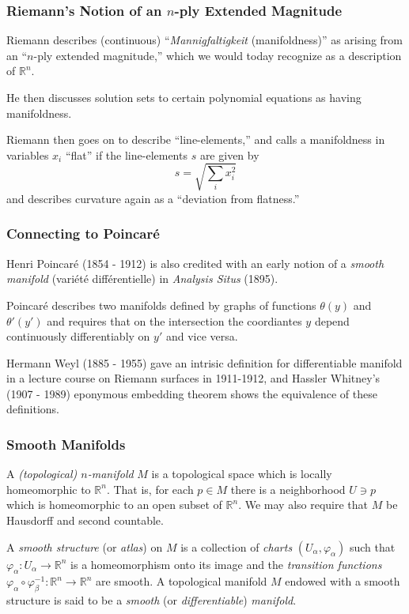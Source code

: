 \documentclass[handout]{beamer}
\newcommand{\R}{\mathbb{R}}
\theoremstyle{definition}
\begin{document}
\begin{frame}
    \frametitle{Riemann's Notion of an $n$-ply Extended Magnitude}

    Riemann describes (continuous) ``\textit{Mannigfaltigkeit} (manifoldness)''
    as arising from an ``$n$-ply extended magnitude,'' which we would today recognize
    as a description of $\R^n$.

    He then discusses solution sets to certain polynomial equations as having
    manifoldness.

    Riemann then goes on to describe ``line-elements,'' and calls a manifoldness
    in variables $x_i$ ``flat'' if the line-elements $s$ are given by
    \[
      s = \sqrt{\sum_i x_i^2}
    \]
    and describes curvature again as a ``deviation from flatness.''

\end{frame}

\begin{frame}
    \frametitle{Connecting to Poincar\'{e}}

    Henri Poincar\'{e} (1854 - 1912) is also credited with an early notion of
    a \emph{smooth manifold} (variété différentielle) in \textit{Analysis Situs}
    (1895).

    Poincar\'{e} describes two manifolds defined by graphs of functions $\theta(y)$
    and $\theta'(y')$ and requires that on the intersection the coordiantes $y$ depend
    continuously differentiably on $y'$ and vice versa.

    Hermann Weyl (1885 - 1955) gave an intrisic definition for differentiable manifold
    in a lecture course on Riemann surfaces in 1911-1912, and Hassler Whitney's (1907 - 1989)
    eponymous embedding theorem shows the equivalence of these definitions.

\end{frame}

\begin{frame}
    \frametitle{Smooth Manifolds}

    \begin{definition}
        A \emph{(topological) $n$-manifold} $M$ is a topological space which is
        locally homeomorphic to $\R^n$. That is, for each $p \in M$ there is
        a neighborhood $U \ni p$ which is homeomorphic to an open subset of $\R^n$.
        We may also require that $M$ be Hausdorff and second countable.
    \end{definition}
    \begin{definition}
        A \emph{smooth structure} (or \emph{atlas}) on $M$ is a collection
        of \emph{charts} $(U_\alpha, \varphi_\alpha)$ such that
        $\varphi_\alpha : U_\alpha \to \R^n$ is a homeomorphism onto its image
        and the \emph{transition functions}
        $\varphi_\alpha \circ \varphi_\beta^{-1} : \R^n \to \R^n$
        are smooth. A topological manifold $M$ endowed with a smooth structure is
        said to be a \emph{smooth} (or \emph{differentiable}) \emph{manifold}.
    \end{definition}
\end{frame}
\end{document}
